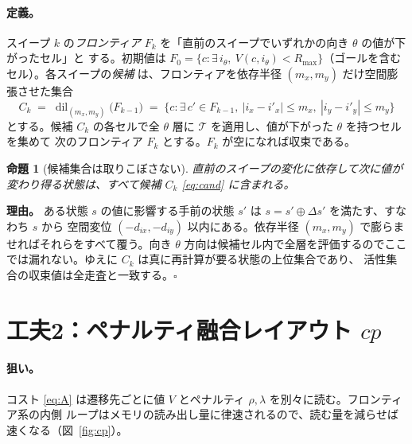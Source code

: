 \documentclass[11pt]{ltjsarticle}
\newtheorem{proposition}{命題}
\newcommand{\Rmax}{R_{\max}}        %
\begin{document}
\paragraph{定義。}
スイープ $k$ の\emph{フロンティア} $F_k$ を「直前のスイープでいずれかの向き $\theta$ の値が下がったセル」と
する。初期値は $F_0=\{c:\exists\,i_\theta,\ V(c,i_\theta)<\Rmax\}$（ゴールを含むセル）。各スイープの\emph{候補}
は、フロンティアを依存半径 $(m_x,m_y)$ だけ空間膨張させた集合
\begin{equation}
C_k \;=\; \operatorname{dil}_{(m_x,m_y)}\!\big(F_{k-1}\big)
\;=\;\big\{c:\exists\,c'\in F_{k-1},\ |i_x-i'_x|\le m_x,\ |i_y-i'_y|\le m_y\big\}
\label{eq:cand}
\end{equation}
とする。候補 $C_k$ の各セルで全 $\theta$ 層に $\mathcal{T}$ を適用し、値が下がった $\theta$ を持つセルを集めて
次のフロンティア $F_k$ とする。$F_k$ が空になれば収束である。

\begin{proposition}[候補集合は取りこぼさない]
\label{prop:cand}
直前のスイープの変化に依存して次に値が変わり得る状態は、すべて候補 $C_k$ \eqref{eq:cand} に含まれる。
\end{proposition}

\noindent
\textbf{理由。} ある状態 $s$ の値に影響する手前の状態 $s'$ は $s=s'\oplus\Delta s'$ を満たす、すなわち $s$ から
空間変位 $(-d_{ix},-d_{iy})$ 以内にある。依存半径 $(m_x,m_y)$ で膨らませればそれらをすべて覆う。向き $\theta$
方向は候補セル内で全層を評価するのでここでは漏れない。ゆえに $C_k$ は真に再計算が要る状態の上位集合であり、
活性集合の収束値は全走査と一致する。$\square$

\section{工夫2：ペナルティ融合レイアウト $cp$}
\label{sec:fused}

\paragraph{狙い。}
コスト \eqref{eq:A} は遷移先ごとに値 $V$ とペナルティ $\rho,\lambda$ を別々に読む。フロンティア系の内側
ループはメモリの読み出し量に律速されるので、読む量を減らせば速くなる（図~\ref{fig:cp}）。
\end{document}
